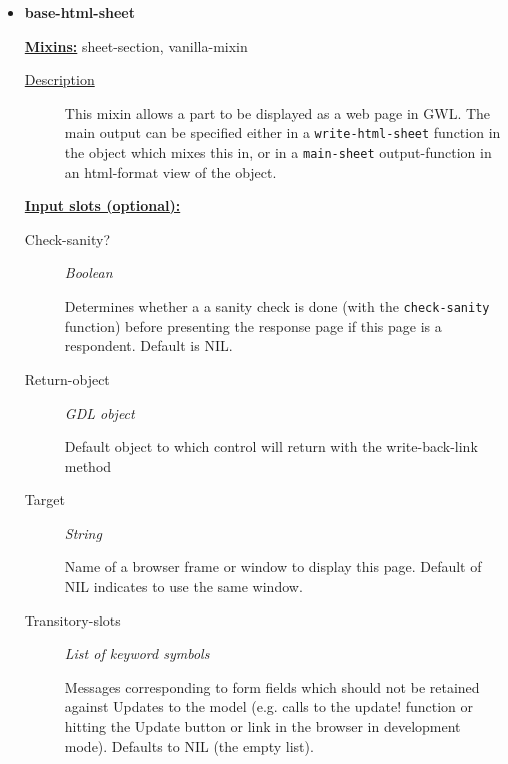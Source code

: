\documentclass [11pt]{book}
\begin{document}
\begin{itemize}
\item {}
\label{prim:base-html-sheet}
\textbf{base-html-sheet}


\textbf{
\underline{Mixins:}} sheet-section, vanilla-mixin





\begin{description}

\item [
\underline{Description}]


This mixin allows a part to be displayed as a web page in GWL. 
The main output can be specified either in a \texttt{write-html-sheet} function in the object which
mixes  this in, or in a \texttt{main-sheet} output-function in an html-format view of the 
object.



\end{description}








\textbf{
\underline{Input slots (optional):}}

\begin{description}

\item [Check-sanity?]
\emph{Boolean}

 Determines whether a a sanity check is done (with the \texttt{check-sanity} function) before
presenting the response page if this page is a respondent. Default is NIL.




\item [Return-object]
\emph{GDL object}

 Default object to which control will return with the write-back-link method




\item [Target]
\emph{String}

 Name of a browser frame or window to display this page. Default of NIL indicates to use the same window.




\item [Transitory-slots]
\emph{List of keyword symbols}

 Messages corresponding to form fields which should not be retained
against Updates to the model (e.g. calls to the update! function or hitting the Update button or link in
the browser in development mode). Defaults to NIL (the empty list).





\end{description}
\end{itemize}
\end{document}
